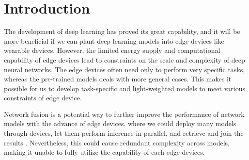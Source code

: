 \documentclass[acmsmall,nonacm]{acmart}\settopmatter{}
\begin{document}





\keywords{}  %


\maketitle

\section{Introduction}
The development of deep learning has proved its great capability, and it will be more beneficial if we can plant deep learning models into edge devices like wearable devices.
However, the limited energy supply and computational capability of edge devices lead to constraints on the scale and complexity of deep neural networks.
The edge devices often need only to perform very specific tasks, whereas the pre-trained models deals with more general cases.
This makes it possible for us to develop task-specific and light-weighted models to meet various constraints of edge device.

Network fusion is a potential way to further improve the performance of network models with the advance of edge devices, where we could deploy many models through devices, let them perform inference in parallel, and retrieve and join the results \cite{fang2019teamnet}.
Nevertheless, this could cause redundant complexity across models, making it unable to fully utilize the capability of each edge devices.
\end{document}
